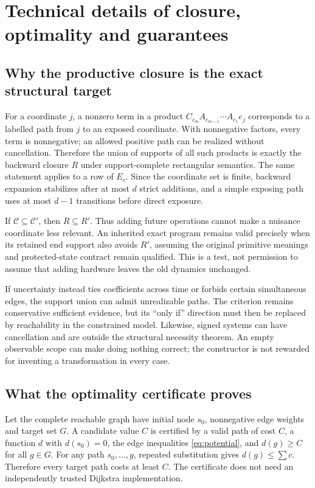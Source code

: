 \documentclass[11pt,letterpaper]{article}
\theoremstyle{definition}\newtheorem{definition}[theorem]{Definition}
\theoremstyle{remark}\newtheorem{remark}[theorem]{Remark}
\begin{document}
\appendix
\section{Technical details of closure, optimality and guarantees}
\label{app:math}
\subsection{Why the productive closure is the exact structural target}
For a coordinate $j$, a nonzero term in a product $C_{c_m}A_{c_{m-1}}\cdots A_{c_1}e_j$ corresponds to a labelled path from $j$ to an exposed coordinate. With nonnegative factors, every term is nonnegative; an allowed positive path can be realized without cancellation. Therefore the union of supports of all such products is exactly the backward closure $R$ under support-complete rectangular semantics. The same statement applies to a row of $E_c$. Since the coordinate set is finite, backward expansion stabilizes after at most $d$ strict additions, and a simple exposing path uses at most $d-1$ transitions before direct exposure.

If $\mathcal C\subseteq\mathcal C'$, then $R\subseteq R'$. Thus adding future operations cannot make a nuisance coordinate less relevant. An inherited exact program remains valid precisely when its retained end support also avoids $R'$, assuming the original primitive meanings and protected-state contract remain qualified. This is a test, not permission to assume that adding hardware leaves the old dynamics unchanged.

If uncertainty instead ties coefficients across time or forbids certain simultaneous edges, the support union can admit unrealizable paths. The criterion remains conservative sufficient evidence, but its ``only if'' direction must then be replaced by reachability in the constrained model. Likewise, signed systems can have cancellation and are outside the structural necessity theorem. An empty observable scope can make doing nothing correct; the constructor is not rewarded for inventing a transformation in every case.

\subsection{What the optimality certificate proves}
Let the complete reachable graph have initial node $s_0$, nonnegative edge weights and target set $G$. A candidate value $C$ is certified by a valid path of cost $C$, a function $d$ with $d(s_0)=0$, the edge inequalities \eqref{eq:potential}, and $d(g)\geq C$ for all $g\in G$. For any path $s_0,\ldots,g$, repeated substitution gives $d(g)\leq\sum c$. Therefore every target path costs at least $C$. The certificate does not need an independently trusted Dijkstra implementation.
\end{document}
